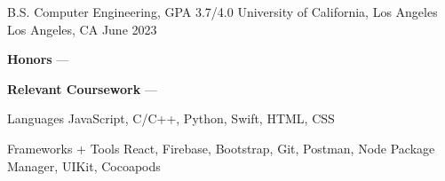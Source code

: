 \documentclass[12pt, letterpaper]{awesome-cv}
\begin{document}
\makecvheader


\begin{cventries}
  \cventry
    {B.S. Computer Engineering, GPA 3.7/4.0} %
    {University of California, Los Angeles} %
    {Los Angeles, CA} %
    {June 2023} %
    {
      \begin{cvitems} %
      \item {\textbf{Honors} --- }
        \item {\textbf{Relevant Coursework} --- }
      \end{cvitems}
    }
  \vspace{-0.2in}
\end{cventries}

\begin{cvskills}
  \cvskill
    {Languages} %
    {JavaScript, C/C++, Python, Swift, HTML, CSS} %

  \cvskill
    {Frameworks + Tools} %
    {React, Firebase, Bootstrap, Git, Postman, Node Package Manager, UIKit, Cocoapods} %
  
    
\end{cvskills}
\end{document}
